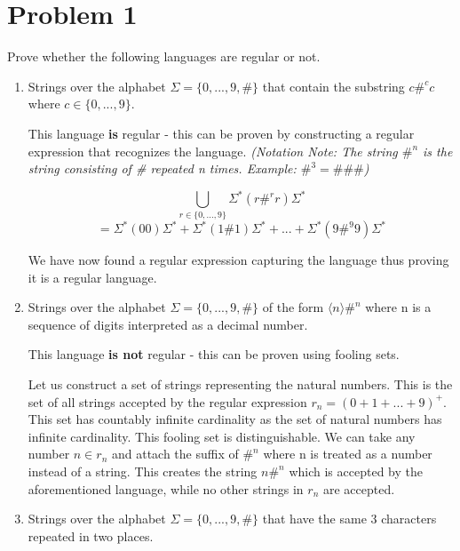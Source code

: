 \documentclass[11pt, letterpaper]{article}
\begin{document}
\section*{Problem 1}
Prove whether the following languages are regular or not.

\begin{enumerate}[label=\Alph*]

\item Strings over the alphabet $\Sigma = \{0,...,9,\#\}$ that contain the substring $c\#^cc$ where $c \in \{0,...,9\} $.

\quad This language \textbf{is} regular - this can be proven by constructing a regular expression that recognizes the language. \textit{(Notation Note: The string $\#^n$ is the string consisting of \# repeated n times. Example: $\#^3 = \#\#\#$)}

$$ \bigcup_{r \in \{0,...,9\}} \Sigma^* (r \#^r r) \Sigma^* $$
$$= \Sigma^*(00)\Sigma^* + \Sigma^*(1\#1)\Sigma^* + ... + \Sigma^*(9\#^9 9)\Sigma^*$$

\quad We have now found a regular expression capturing the language thus proving it is a regular language.


\item Strings over the alphabet $\Sigma = \{0,...,9,\#\}$ of the form $\langle n \rangle \#^n$ where n is a sequence of digits interpreted as a decimal number.

This language \textbf{is not} regular - this can be proven using fooling sets.

\quad Let us construct a set of strings representing the natural numbers. This is the set of all strings accepted by the regular expression $r_n = (0 + 1 + ... + 9)^+$. This set has countably infinite cardinality as the set of natural numbers has infinite cardinality. This fooling set is distinguishable. We can take any number $n \in r_n$ and attach the suffix of $\#^n$ where n is treated as a number instead of a string. This creates the string $n\#^n$ which is accepted by the aforementioned language, while no other strings in $r_n$ are accepted.

\item Strings over the alphabet $\Sigma = \{0,...,9,\#\}$ that have the same 3 characters repeated in two places.


\end{enumerate}
\end{document}
